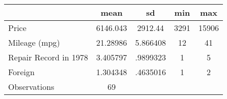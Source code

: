 {
\def\sym#1{\ifmmode^{#1}\else\(^{#1}\)\fi}
\begin{tabular}{l*{1}{cccc}}
\hline\hline
                    &        mean&          sd&         min&         max\\
\hline
Price               &    6146.043&     2912.44&        3291&       15906\\
Mileage (mpg)       &    21.28986&    5.866408&          12&          41\\
Repair Record in 1978&    3.405797&    .9899323&           1&           5\\
Foreign             &    1.304348&    .4635016&           1&           2\\
\hline
Observations        &          69&            &            &            \\
\hline\hline
\end{tabular}
}
